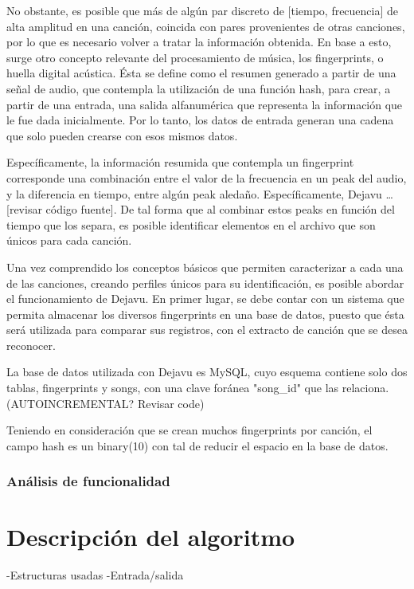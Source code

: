 \bigskip


No obstante, es posible que más de algún par discreto de [tiempo, frecuencia] de alta amplitud en una canción, coincida con pares provenientes de otras canciones, por lo que es necesario volver a tratar la información obtenida. En base a esto, surge otro concepto relevante del procesamiento de música, los fingerprints, o huella digital acústica. Ésta se define como el resumen generado a partir de una señal de audio, que contempla la utilización de una función hash, para crear, a partir de una entrada, una salida alfanumérica que representa la información que le fue dada inicialmente. Por lo tanto, los datos de entrada generan una cadena que solo pueden crearse con esos mismos datos.

\bigskip

Específicamente, la información resumida que contempla un fingerprint corresponde una combinación entre el valor de la frecuencia en un peak del audio, y la diferencia en tiempo, entre algún peak aledaño. Específicamente, Dejavu …[revisar código fuente]. De tal forma que al combinar estos peaks en función del tiempo que los separa, es posible identificar elementos en el archivo que son únicos para cada canción.

\bigskip

Una vez comprendido los conceptos básicos que permiten caracterizar a cada una de las canciones, creando perfiles únicos para su identificación, es posible abordar el funcionamiento de Dejavu. En primer lugar, se debe contar con un sistema que permita almacenar los diversos fingerprints en una base de datos, puesto que ésta será utilizada para comparar sus registros, con el extracto de canción que se desea reconocer.

\bigskip

La base de datos utilizada con Dejavu es MySQL, cuyo esquema contiene solo dos tablas, fingerprints y songs, con una clave foránea "song\_id" que las relaciona. (AUTOINCREMENTAL? Revisar code)


\bigskip


Teniendo en consideración que se crean muchos fingerprints por canción, el campo hash es un binary(10) con tal de reducir el espacio en la base de datos.

\subsubsection{Análisis de funcionalidad}


\lipsum[2-4]

\section{Descripción del algoritmo}

-Estructuras usadas
-Entrada/salida
\lipsum[2-4]


